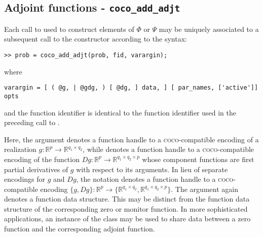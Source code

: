 \subsection{Adjoint functions - \texttt{coco\_add\_adjt}}
Each call to  used to construct elements of $\Phi$ or $\Psi$ may be uniquely associated to a subsequent call to the  constructor according to the syntax:
\begin{lstlisting}[language=coco-highlight]
>> prob = coco_add_adjt(prob, fid, varargin);
\end{lstlisting}
where
\begin{lstlisting}[language=coco-highlight]
varargin = [ ( @g, | @gdg, ) [ @dg, ] data, ] [ par_names, ['active']] opts
\end{lstlisting}
and the function identifier  is identical to the function identifier used in the preceding call to .

Here, the argument  denotes a function handle to a \textsc{coco}-compatible encoding of a realization $g:\mathbb{R}^{p}\rightarrow\mathbb{R}^{q_1\times q_2}$, while  denotes a function handle to a \textsc{coco}-compatible encoding of the function $Dg:\mathbb{R}^{p}\rightarrow\mathbb{R}^{q_1\times q_2\times p}$ whose component functions are first partial derivatives of $g$ with respect to its arguments. In lieu of separate encodings for $g$ and $Dg$, the notation  denotes a function handle to a \textsc{coco}-compatible encoding $\{g,Dg\}:\mathbb{R}^p\rightarrow\{\mathbb{R}^{q_1\times q_2},\mathbb{R}^{q_1\times q_2\times p}\}$. The  argument again denotes a function data structure. This may be distinct from the function data structure of the corresponding zero or monitor function. In more sophisticated applications, an instance of the  class may be used to share data between a zero function and the corresponding adjoint function.

